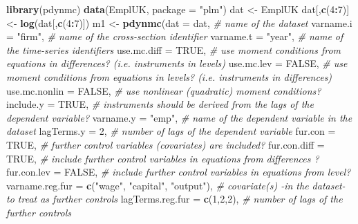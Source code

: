 \documentclass[
  12pt,
]{book}
\newenvironment{Shaded}{\begin{snugshade}}{\end{snugshade}}
\newcommand{\AttributeTok}[1]{\textcolor[rgb]{0.13,0.29,0.53}{#1}}
\newcommand{\CommentTok}[1]{\textcolor[rgb]{0.56,0.35,0.01}{\textit{#1}}}
\newcommand{\ConstantTok}[1]{\textcolor[rgb]{0.56,0.35,0.01}{#1}}
\newcommand{\DecValTok}[1]{\textcolor[rgb]{0.00,0.00,0.81}{#1}}
\newcommand{\FunctionTok}[1]{\textcolor[rgb]{0.13,0.29,0.53}{\textbf{#1}}}
\newcommand{\NormalTok}[1]{#1}
\newcommand{\OtherTok}[1]{\textcolor[rgb]{0.56,0.35,0.01}{#1}}
\newcommand{\SpecialCharTok}[1]{\textcolor[rgb]{0.81,0.36,0.00}{\textbf{#1}}}
\newcommand{\StringTok}[1]{\textcolor[rgb]{0.31,0.60,0.02}{#1}}
\theoremstyle{definition}
\theoremstyle{definition}
\theoremstyle{definition}
\theoremstyle{definition}
\theoremstyle{remark}
\begin{document}
\begin{Shaded}
\begin{Highlighting}[]
\FunctionTok{library}\NormalTok{(pdynmc)}
\FunctionTok{data}\NormalTok{(EmplUK, }\AttributeTok{package =} \StringTok{"plm"}\NormalTok{)}
\NormalTok{dat }\OtherTok{\textless{}{-}}\NormalTok{ EmplUK}
\NormalTok{dat[,}\FunctionTok{c}\NormalTok{(}\DecValTok{4}\SpecialCharTok{:}\DecValTok{7}\NormalTok{)]         }\OtherTok{\textless{}{-}} \FunctionTok{log}\NormalTok{(dat[,}\FunctionTok{c}\NormalTok{(}\DecValTok{4}\SpecialCharTok{:}\DecValTok{7}\NormalTok{)])}
\NormalTok{m1 }\OtherTok{\textless{}{-}} \FunctionTok{pdynmc}\NormalTok{(}\AttributeTok{dat =}\NormalTok{ dat, }\CommentTok{\# name of the dataset}
             \AttributeTok{varname.i =} \StringTok{"firm"}\NormalTok{, }\CommentTok{\# name of the cross{-}section identifier}
             \AttributeTok{varname.t =} \StringTok{"year"}\NormalTok{, }\CommentTok{\# name of the time{-}series identifiers}
             \AttributeTok{use.mc.diff =} \ConstantTok{TRUE}\NormalTok{, }\CommentTok{\# use moment conditions from equations in differences? (i.e. instruments in levels) }
             \AttributeTok{use.mc.lev =} \ConstantTok{FALSE}\NormalTok{, }\CommentTok{\# use moment conditions from equations in levels? (i.e. instruments in differences)}
             \AttributeTok{use.mc.nonlin =} \ConstantTok{FALSE}\NormalTok{, }\CommentTok{\# use nonlinear (quadratic) moment conditions?}
             \AttributeTok{include.y =} \ConstantTok{TRUE}\NormalTok{, }\CommentTok{\# instruments should be derived from the lags of the dependent variable?}
             \AttributeTok{varname.y =} \StringTok{"emp"}\NormalTok{, }\CommentTok{\# name of the dependent variable in the dataset}
             \AttributeTok{lagTerms.y =} \DecValTok{2}\NormalTok{, }\CommentTok{\# number of lags of the dependent variable}
             \AttributeTok{fur.con =} \ConstantTok{TRUE}\NormalTok{, }\CommentTok{\# further control variables (covariates) are included?}
             \AttributeTok{fur.con.diff =} \ConstantTok{TRUE}\NormalTok{, }\CommentTok{\# include further control variables in equations from differences ?}
             \AttributeTok{fur.con.lev =} \ConstantTok{FALSE}\NormalTok{, }\CommentTok{\# include further control variables in equations from level?}
             \AttributeTok{varname.reg.fur =} \FunctionTok{c}\NormalTok{(}\StringTok{"wage"}\NormalTok{, }\StringTok{"capital"}\NormalTok{, }\StringTok{"output"}\NormalTok{), }\CommentTok{\# covariate(s) {-}in the dataset{-} to treat as further controls}
             \AttributeTok{lagTerms.reg.fur =} \FunctionTok{c}\NormalTok{(}\DecValTok{1}\NormalTok{,}\DecValTok{2}\NormalTok{,}\DecValTok{2}\NormalTok{), }\CommentTok{\# number of lags of the further controls}

\end{Highlighting}
\end{Shaded}
\end{document}
